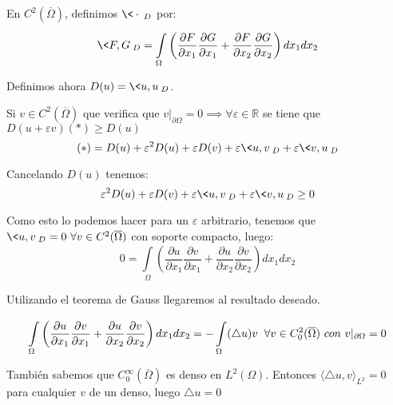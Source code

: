 \documentclass[openany]{book}
\begin{document}
\begin{demonstration}
    
    En $ C^2(\overline{\Omega}) $, definimos $ \<\cdot \>_{D} $ por:
    $$ \<F,G\>_{D} = \int\limits_{\Omega}^{} \left( \dfrac{\partial F}{\partial x_1} \dfrac{\partial G}{\partial x_1} + \dfrac{\partial F}{\partial x_2} \dfrac{\partial G}{\partial x_2} \right) dx_1dx_2$$

    Definimos ahora $ D(u) = \<u,u\>_{D} $.

    Si $ v \in C^2(\overline{\Omega}) $ que verifica que $ v|_{\partial \Omega} = 0 \implies \forall  \varepsilon \in \mathbb{R} $ se tiene que $ D(u+ \varepsilon v) (*)\geq  D(u) $
    $$ (*) = D(u)+ \varepsilon^2 D(u) + \varepsilon D(v) + \varepsilon \<u,v\>_{D}+ \varepsilon \<v,u\>_{D} $$

    Cancelando $ D(u) $ tenemos:
    $$ \varepsilon^2 D(u) + \varepsilon D(v) + \varepsilon \<u,v\>_{D}+ \varepsilon \<v,u\>_{D}\geq  0 $$

    Como esto lo podemos hacer para un $ \varepsilon $ arbitrario, tenemos que $ \<u,v\>_{D} = 0\ \forall v \in C^2(\overline{\Omega }) $ con soporte compacto, luego:
    $$ 0 = \int\limits_{\Omega}^{} \left( \dfrac{\partial u}{\partial x_1} \dfrac{\partial v}{\partial x_1}+ \dfrac{\partial u}{\partial x_2} \dfrac{\partial v}{\partial x_2} \right) dx_1 dx_2 $$

    Utilizando el teorema de Gauss llegaremos al resultado deseado.

    $$ \int\limits_{\Omega}^{} \left( \dfrac{\partial u}{\partial x_1} \dfrac{\partial v}{\partial x_1}+ \dfrac{\partial u}{\partial x_2} \dfrac{\partial v}{\partial x_2} \right) dx_1 dx_2 = - \int\limits_{\Omega }^{} (\triangle u)v \hspace{2mm} \forall  v \in C_0^2(\overline{\Omega })\ con\ v|_{\partial \Omega } = 0 $$

    También sabemos que $ C_0^{\infty}(\overline{\Omega }) $ es denso en $ L^2(\Omega ) $. Entonces $ \langle \triangle u, v \rangle_{L^2} = 0 $ para cualquier $ v $ de un denso, luego $ \triangle u = 0 $


\end{demonstration}


\end{document}
